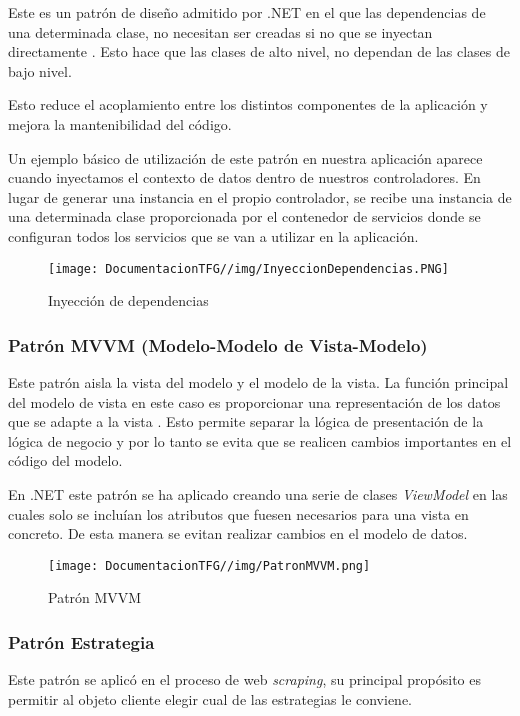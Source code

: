 Este es un patrón de diseño admitido por .NET en el que las dependencias de una determinada clase, no necesitan ser creadas si no que se inyectan directamente \cite{inyecciondependencias:latex}. Esto hace que las clases de alto nivel, no dependan de las clases de bajo nivel.

Esto reduce el acoplamiento entre los distintos componentes de la aplicación y mejora la mantenibilidad del código.

Un ejemplo básico de utilización de este patrón en nuestra aplicación aparece cuando inyectamos el contexto de datos dentro de nuestros controladores. En lugar de generar una instancia en el propio controlador, se recibe una instancia de una determinada clase proporcionada por el contenedor de servicios donde se configuran todos los servicios que se van a utilizar en la aplicación.

\begin{figure}[H]
    \centering
    \texttt{[image: DocumentacionTFG//img/InyeccionDependencias.PNG]}
    \caption{Inyección de dependencias}
\end{figure}

\subsubsection{Patrón MVVM (Modelo-Modelo de Vista-Modelo)}

Este patrón aisla la vista del modelo y el modelo de la vista. La función principal del modelo de vista en este caso es proporcionar una representación de los datos que se adapte a la vista \cite{patronmvvm:latex}. Esto permite separar la lógica de presentación de la lógica de negocio y por lo tanto se evita que se realicen cambios importantes en el código del modelo.

En .NET este patrón se ha aplicado creando una serie de clases \textit{ViewModel} en las cuales solo se incluían los atributos que fuesen necesarios para una vista en concreto. De esta manera se evitan realizar cambios en el modelo de datos.

\begin{figure}[H]
    \centering
    \texttt{[image: DocumentacionTFG//img/PatronMVVM.png]}
    \caption{Patrón MVVM}
\end{figure}

\subsubsection{Patrón Estrategia}
Este patrón se aplicó en el proceso de web \textit{scraping}, su principal propósito es permitir al objeto cliente elegir cual de las estrategias le conviene.

